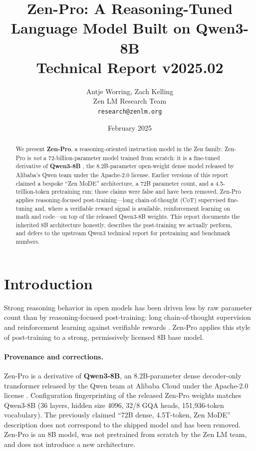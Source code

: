 \documentclass[11pt,a4paper]{article}
\title{\textbf{Zen-Pro: A Reasoning-Tuned Language Model Built on Qwen3-8B}\\
\large Technical Report v2025.02}
\author{Antje Worring, Zach Kelling \\ Zen LM Research Team\\
\texttt{research@zenlm.org}}
\date{February 2025}
\begin{document}
\maketitle

\begin{abstract}
We present \textbf{Zen-Pro}, a reasoning-oriented instruction model in the Zen family. Zen-Pro is
\emph{not} a 72-billion-parameter model trained from scratch: it is a fine-tuned derivative of
\textbf{Qwen3-8B} \cite{qwen3report}, the 8.2B-parameter open-weight dense model released by
Alibaba's Qwen team under the Apache-2.0 license. Earlier versions of this report claimed a bespoke
``Zen MoDE'' architecture, a 72B parameter count, and a 4.5-trillion-token pretraining run; those
claims were false and have been removed. Zen-Pro applies reasoning-focused post-training---long
chain-of-thought (CoT) supervised fine-tuning and, where a verifiable reward signal is available,
reinforcement learning on math and code---on top of the released Qwen3-8B weights. This report
documents the inherited 8B architecture honestly, describes the post-training we actually perform,
and defers to the upstream Qwen3 technical report for pretraining and benchmark numbers.
\end{abstract}

\tableofcontents
\newpage

\section{Introduction}

Strong reasoning behavior in open models has been driven less by raw parameter count than by
reasoning-focused post-training: long chain-of-thought supervision and reinforcement learning
against verifiable rewards \cite{lightman2023lets, shao2024deepseekmath}. Zen-Pro applies this style
of post-training to a strong, permissively licensed 8B base model.

\paragraph{Provenance and corrections.} Zen-Pro is a derivative of \textbf{Qwen3-8B}, an
8.2B-parameter dense decoder-only transformer released by the Qwen team at Alibaba Cloud under the
Apache-2.0 license \cite{qwen3report, qwen3hf}. Configuration fingerprinting of the released Zen-Pro
weights matches Qwen3-8B (36 layers, hidden size 4096, 32/8 GQA heads, 151{,}936-token vocabulary).
The previously claimed ``72B dense, 4.5T-token, Zen MoDE'' description does not correspond to the
shipped model and has been removed. Zen-Pro is an 8B model, was not pretrained from scratch by the
Zen LM team, and does not introduce a new architecture.
\end{document}
